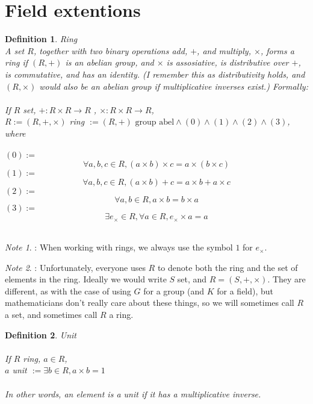 \documentclass{article}
\theoremstyle{definitionstyle}
\newtheorem{defn}{Definition}[section]
\theoremstyle{lemmastyle}
\theoremstyle{remark}
\newtheorem*{note}{Note}
\begin{document}
\section{Field extentions}
%
\begin{defn} Ring\\

A set $R$, together with two binary operations add, $+$, and multiply, $\times$, forms a ring if $(R,+)$ is an abelian group, and $\times$ is assosiative, is distributive over $+$, is commutative, and has an identity. (I remember this as distributivity holds, and $(R,\times)$ would also be an abelian group if multiplicative inverses exist.) Formally:\\
\\
If $R$ set, $+ : R \times R \to R$ , $\times : R \times R \to R$,\\

$R:=(R,+,\times)$ ring $:= (R,+)\textrm{ group abel}  \land (0) \land (1) \land (2) \land (3)$, where\\
\\
$(0):=$\[\forall a,b,c\in R, (a\times b)\times c = a \times (b\times c)\]
$(1):=$\[\forall a,b,c\in R, (a\times b) + c = a\times b + a \times c\]
$(2):=$\[\forall a,b \in R, a\times b = b\times a\]
$(3):=$\[\exists e_\times \in R, \forall a \in R, e_\times \times a = a\]
\\
\end{defn}
\begin{note}: When working with rings, we always use the symbol $1$ for $e_\times$. \\ \end{note}
\begin{note}: Unfortunately, everyone uses $R$ to denote both the ring and the set of elements in the ring. Ideally we would write $S$ set, and $R = (S,+,\times)$. They are different, as with the case of using $G$ for a group (and $K$ for a field), but mathematicians don't really care about these things, so we will sometimes call $R$ a set, and sometimes call $R$ a ring. \end{note}
%
\begin{defn} Unit\\
\\
If $R$ ring, $a \in R$,\\

$a$ unit $:= \exists b \in R, a \times b = 1$\\
\\
In other words, an element is a unit if it has a multiplicative inverse.
%
\end{defn}
\end{document}
